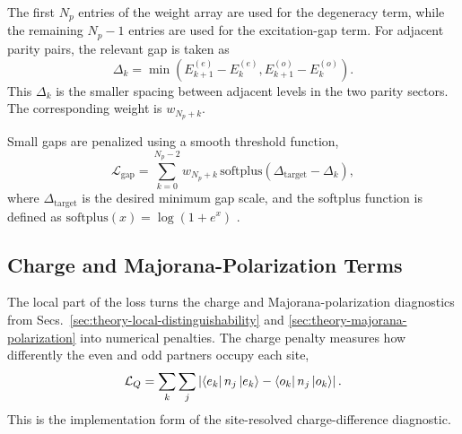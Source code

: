 The first $N_p$ entries of the weight array are used for the degeneracy term, while the remaining $N_p-1$ entries are used for the excitation-gap term. For adjacent parity pairs, the relevant gap is taken as
\begin{equation}
\Delta_k
=
\min\left(
E_{k+1}^{(e)}-E_k^{(e)},
E_{k+1}^{(o)}-E_k^{(o)}
\right).
\end{equation}
This $\Delta_k$ is the smaller spacing between adjacent levels in the two parity sectors. The corresponding weight is $w_{N_p+k}$.

Small gaps are penalized using a smooth threshold function,
\begin{equation}
\mathcal{L}_{\mathrm{gap}}
=
\sum_{k=0}^{N_p-2} w_{N_p+k}\,
\mathrm{softplus}
\left(
\Delta_{\mathrm{target}}-\Delta_k
\right),
\end{equation}
where $\Delta_{\mathrm{target}}$ is the desired minimum gap scale, and the softplus function is defined as $\mathrm{softplus}(x) = \log(1 + e^x)$ \cite{NIPS2000_44968aec}.


\subsection{Charge and Majorana-Polarization Terms}
The local part of the loss turns the charge and Majorana-polarization diagnostics from Secs.~\ref{sec:theory-local-distinguishability} and \ref{sec:theory-majorana-polarization} into numerical penalties. The charge penalty measures how differently the even and odd partners occupy each site,
\begin{equation}
\mathcal{L}_{Q}
=
\sum_{k}\sum_{j}
\left|
\bra{e_k}n_j\ket{e_k}
-
\bra{o_k}n_j\ket{o_k}
\right|.
\end{equation}
This is the implementation form of the site-resolved charge-difference diagnostic.

